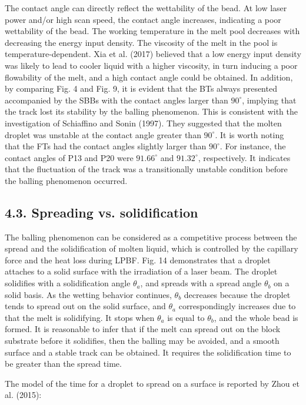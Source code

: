 \documentclass[10pt]{article}
\begin{document}
The contact angle can directly reflect the wettability of the bead. At low laser power and/or high scan speed, the contact angle increases, indicating a poor wettability of the bead. The working temperature in the melt pool decreases with decreasing the energy input density. The viscosity of the melt in the pool is temperature-dependent. Xia et al. (2017) believed that a low energy input density was likely to lead to cooler liquid with a higher viscosity, in turn inducing a poor flowability of the melt, and a high contact angle could be obtained. In addition, by comparing Fig. 4 and Fig. 9, it is evident that the BTs always presented accompanied by the SBBs with the contact angles larger than $90^{\circ}$, implying that the track lost its stability by the balling phenomenon. This is consistent with the investigation of Schiaffino and Sonin (1997). They suggested that the molten droplet was unstable at the contact angle greater than $90^{\circ}$. It is worth noting that the FTs had the contact angles slightly larger than $90^{\circ}$. For instance, the contact angles of P13 and P20 were $91.66^{\circ}$ and $91.32^{\circ}$, respectively. It indicates that the fluctuation of the track was a transitionally unstable condition before the balling phenomenon occurred.

\subsection*{4.3. Spreading vs. solidification}
The balling phenomenon can be considered as a competitive process between the spread and the solidification of molten liquid, which is controlled by the capillary force and the heat loss during LPBF. Fig. 14 demonstrates that a droplet attaches to a solid surface with the irradiation of a laser beam. The droplet solidifies with a solidification angle $\theta_{a}$, and spreads with a spread angle $\theta_{b}$ on a solid basis. As the wetting behavior continues, $\theta_{b}$ decreases because the droplet tends to spread out on the solid surface, and $\theta_{a}$ correspondingly increases due to that the melt is solidifying. It stops when $\theta_{a}$ is equal to $\theta_{b}$, and the whole bead is formed. It is reasonable to infer that if the melt can spread out on the block substrate before it solidifies, then the balling may be avoided, and a smooth surface and a stable track can be obtained. It requires the solidification time to be greater than the spread time.

The model of the time for a droplet to spread on a surface is reported by Zhou et al. (2015):
\end{document}

